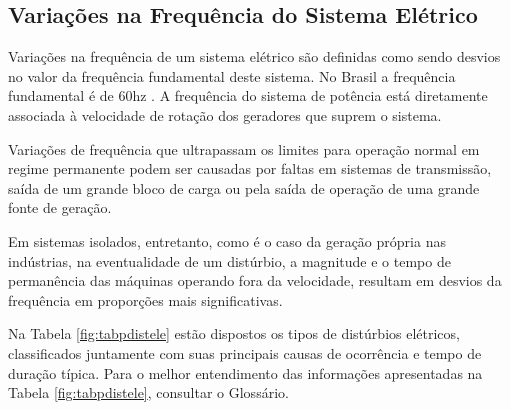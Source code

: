 \subsection{Variações na Frequência do Sistema Elétrico}
\par
Variações na frequência de um sistema elétrico são definidas como sendo desvios no valor da frequência fundamental deste sistema. No Brasil a frequência fundamental é de 60hz \cite{DUG96}. A frequência do sistema de potência está diretamente associada à velocidade de rotação dos geradores que suprem o sistema.
\par
Variações de frequência que ultrapassam os limites para operação normal em regime permanente podem ser causadas por faltas em sistemas de transmissão, saída de um grande bloco de carga ou pela saída de operação de uma grande fonte de geração.
\par
Em sistemas isolados, entretanto, como é o caso da geração própria nas indústrias, na eventualidade de um distúrbio, a magnitude e o tempo de permanência das máquinas operando fora da velocidade, resultam em desvios da frequência em proporções mais significativas.
\par
Na Tabela \ref{fig:tabpdistele} estão dispostos os tipos de distúrbios elétricos, classificados juntamente com suas principais causas de ocorrência e tempo de duração típica. Para o melhor entendimento das informações apresentadas na Tabela \ref{fig:tabpdistele}, consultar o Glossário.%
